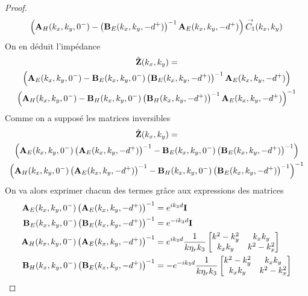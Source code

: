 \begin{proof}
\begin{multline*}
                \left(\mathbf{A}_H(k_x,k_y,0^-)-\left(\mathbf{B}_E(k_x,k_y,-d^+)\right)^{-1}\mathbf{A}_E(k_x,k_y,-d^+)\right){\overset{\rightarrow}{C_1}}(k_x,k_y)
            \end{multline*}
            On en déduit l'impédance
            \begin{multline*}
                \hat {\mathbf{Z}}(k_x,k_y) =
                \\
                \left(\mathbf{A}_E(k_x,k_y,0^-)-\mathbf{B}_E(k_x,k_y,0^-)\left(\mathbf{B}_E(k_x,k_y,-d^+)\right)^{-1}\mathbf{A}_E(k_x,k_y,-d^+)\right)
                \\
                \left(\mathbf{A}_H(k_x,k_y,0^-)-\mathbf{B}_H(k_x,k_y,0^-)\left(\mathbf{B}_H(k_x,k_y,-d^+)\right)^{-1}\mathbf{A}_E(k_x,k_y,-d^+)\right)^{-1}
            \end{multline*}
            Comme on a supposé les matrices inversibles
            \begin{multline*}
                \hat {\mathbf{Z}}(k_x,k_y) =
                \\ \left(\mathbf{A}_E(k_x,k_y,0^-)\left(\mathbf{A}_E(k_x,k_y,-d^+)\right)^{-1}-\mathbf{B}_E(k_x,k_y,0^-)\left(\mathbf{B}_E(k_x,k_y,-d^+)\right)^{-1}\right) 
                \\
                \left(\mathbf{A}_H(k_x,k_y,0^-)\left(\mathbf{A}_E(k_x,k_y,-d^+)\right)^{-1}-\mathbf{B}_H(k_x,k_y,0^-)\left(\mathbf{B}_E(k_x,k_y,-d^+)\right)^{-1}\right)^{-1}
            \end{multline*}
            On va alors exprimer chacun des termes grâce aux expressions des matrices
            \begin{align*}
                \mathbf{A}_E(k_x,k_y,0^-)\left(\mathbf{A}_E(k_x,k_y,-d^+)\right)^{-1} &= e^{ik_3d}\mathbf{I}
                \\
                \mathbf{B}_E(k_x,k_y,0^-)\left(\mathbf{B}_E(k_x,k_y,-d^+)\right)^{-1} &= e^{-ik_3d}\mathbf{I}
                \\
                \mathbf{A}_H(k_x,k_y,0^-)\left(\mathbf{A}_E(k_x,k_y,-d^+)\right)^{-1} &= e^{ik_3d}\dfrac{1}{k\eta_r k_3}
                \begin{bmatrix}
                    k^2 - k_y^2 & k_x k_y
                    \\
                    k_x k _y & k^2 - k_x^2
                \end{bmatrix}
                \\
                \mathbf{B}_H(k_x,k_y,0^-)\left(\mathbf{B}_E(k_x,k_y,-d^+)\right)^{-1} &= -e^{-ik_3d}\dfrac{1}{k\eta_r k_3}
                    \begin{bmatrix}
                    k^2 - k_y^2 & k_x k_y
                    \\
                    k_x k _y & k^2 - k_x^2

\end{bmatrix}
\end{align*}
\end{proof}
